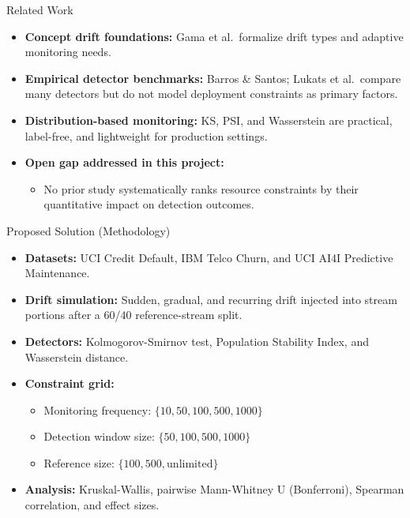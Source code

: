 \documentclass[aspectratio=169]{beamer}
\begin{document}
\begin{frame}{Related Work}
  \begin{itemize}
    \item \textbf{Concept drift foundations:} Gama et al.\ formalize drift types and adaptive monitoring needs.
    \item \textbf{Empirical detector benchmarks:} Barros \& Santos; Lukats et al.\ compare many detectors but do not model deployment constraints as primary factors.
    \item \textbf{Distribution-based monitoring:} KS, PSI, and Wasserstein are practical, label-free, and lightweight for production settings.
    \item \textbf{Open gap addressed in this project:}
    \begin{itemize}
      \item No prior study systematically ranks resource constraints by their quantitative impact on detection outcomes.
    \end{itemize}
  \end{itemize}
\end{frame}

\begin{frame}{Proposed Solution (Methodology)}
  \begin{itemize}
    \item \textbf{Datasets:} UCI Credit Default, IBM Telco Churn, and UCI AI4I Predictive Maintenance.
    \item \textbf{Drift simulation:} Sudden, gradual, and recurring drift injected into stream portions after a 60/40 reference-stream split.
    \item \textbf{Detectors:} Kolmogorov-Smirnov test, Population Stability Index, and Wasserstein distance.
    \item \textbf{Constraint grid:}
    \begin{itemize}
      \item Monitoring frequency: \(\{10, 50, 100, 500, 1000\}\)
      \item Detection window size: \(\{50, 100, 500, 1000\}\)
      \item Reference size: \(\{100, 500, \text{unlimited}\}\)
    \end{itemize}
    \item \textbf{Analysis:} Kruskal-Wallis, pairwise Mann-Whitney U (Bonferroni), Spearman correlation, and effect sizes.
  \end{itemize}
\end{frame}
\end{document}
